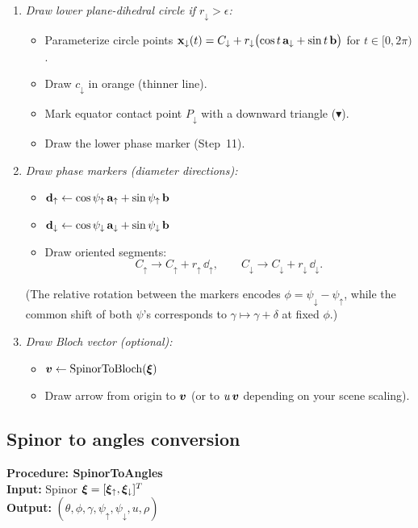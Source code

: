 \begin{enumerate}
\item \textit{Draw lower plane-dihedral circle if $r_\downarrow>\epsilon$:}
\begin{itemize}
    \item Parameterize circle points $\mathbf{x}_\downarrow(t)=C_\downarrow + r_\downarrow\bigl(\cos t\,\mathbf{a}_\downarrow+\sin t\,\mathbf{b}\bigr)$ for $t\in[0,2\pi)$.
    \item Draw $c_\downarrow$ in orange (thinner line).
    \item Mark equator contact point $P_\downarrow$ with a downward triangle ($\blacktriangledown$).
    \item Draw the lower phase marker (Step~11).
\end{itemize}

\item \textit{Draw phase markers (diameter directions):}
\begin{itemize}
    \item $\mathbf{d}_\uparrow \gets \cos\psi_\uparrow\,\mathbf{a}_\uparrow+\sin\psi_\uparrow\,\mathbf{b}$
    \item $\mathbf{d}_\downarrow \gets \cos\psi_\downarrow\,\mathbf{a}_\downarrow+\sin\psi_\downarrow\,\mathbf{b}$
    \item Draw oriented segments:
    \[
      C_\uparrow \to C_\uparrow + r_\uparrow\,\dd_\uparrow,\qquad
      C_\downarrow \to C_\downarrow + r_\downarrow\,\dd_\downarrow.
    \]
\end{itemize}
\noindent
(The relative rotation between the markers encodes $\phi=\psi_\downarrow-\psi_\uparrow$, while the common shift of both $\psi$'s corresponds to $\gamma\mapsto \gamma+\delta$ at fixed $\phi$.)

\item \textit{Draw Bloch vector (optional):}
\begin{itemize}
    \item $\bm{v} \gets \mathrm{SpinorToBloch}(\bm{\xi})$
    \item Draw arrow from origin to $\bm{v}$ (or to $u\,\bm{v}$ depending on your scene scaling).
\end{itemize}
\end{enumerate}

\subsection{Spinor to angles conversion}

\medskip
\noindent\textbf{Procedure: SpinorToAngles}\\
\textbf{Input:} Spinor $\bm{\xi} = [\bm{\xi}_\uparrow, \bm{\xi}_\downarrow]^T$\\
\textbf{Output:} $(\theta,\phi,\gamma,\psi_\uparrow,\psi_\downarrow,u,\rho)$

